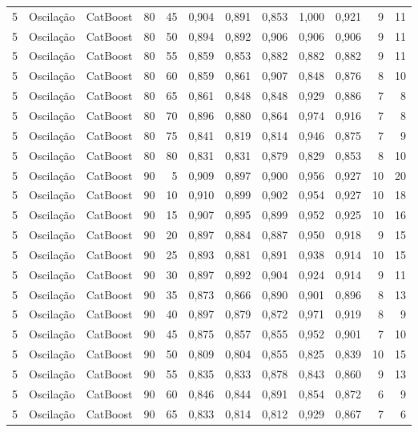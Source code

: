 \begin{longtable}{@{}rllrrrrrrrrr@{}}
5 & Oscilação & CatBoost & 80 & 45 & 0,904 & 0,891 & 0,853 & 1,000 & 0,921 & 9 & 11 \\
5 & Oscilação & CatBoost & 80 & 50 & 0,894 & 0,892 & 0,906 & 0,906 & 0,906 & 9 & 11 \\
5 & Oscilação & CatBoost & 80 & 55 & 0,859 & 0,853 & 0,882 & 0,882 & 0,882 & 9 & 11 \\
5 & Oscilação & CatBoost & 80 & 60 & 0,859 & 0,861 & 0,907 & 0,848 & 0,876 & 8 & 10 \\
5 & Oscilação & CatBoost & 80 & 65 & 0,861 & 0,848 & 0,848 & 0,929 & 0,886 & 7 & 8 \\
5 & Oscilação & CatBoost & 80 & 70 & 0,896 & 0,880 & 0,864 & 0,974 & 0,916 & 7 & 8 \\
5 & Oscilação & CatBoost & 80 & 75 & 0,841 & 0,819 & 0,814 & 0,946 & 0,875 & 7 & 9 \\
5 & Oscilação & CatBoost & 80 & 80 & 0,831 & 0,831 & 0,879 & 0,829 & 0,853 & 8 & 10 \\
5 & Oscilação & CatBoost & 90 & 5 & 0,909 & 0,897 & 0,900 & 0,956 & 0,927 & 10 & 20 \\
5 & Oscilação & CatBoost & 90 & 10 & 0,910 & 0,899 & 0,902 & 0,954 & 0,927 & 10 & 18 \\
5 & Oscilação & CatBoost & 90 & 15 & 0,907 & 0,895 & 0,899 & 0,952 & 0,925 & 10 & 16 \\
5 & Oscilação & CatBoost & 90 & 20 & 0,897 & 0,884 & 0,887 & 0,950 & 0,918 & 9 & 15 \\
5 & Oscilação & CatBoost & 90 & 25 & 0,893 & 0,881 & 0,891 & 0,938 & 0,914 & 10 & 15 \\
5 & Oscilação & CatBoost & 90 & 30 & 0,897 & 0,892 & 0,904 & 0,924 & 0,914 & 9 & 11 \\
5 & Oscilação & CatBoost & 90 & 35 & 0,873 & 0,866 & 0,890 & 0,901 & 0,896 & 8 & 13 \\
5 & Oscilação & CatBoost & 90 & 40 & 0,897 & 0,879 & 0,872 & 0,971 & 0,919 & 8 & 9 \\
5 & Oscilação & CatBoost & 90 & 45 & 0,875 & 0,857 & 0,855 & 0,952 & 0,901 & 7 & 10 \\
5 & Oscilação & CatBoost & 90 & 50 & 0,809 & 0,804 & 0,855 & 0,825 & 0,839 & 10 & 15 \\
5 & Oscilação & CatBoost & 90 & 55 & 0,835 & 0,833 & 0,878 & 0,843 & 0,860 & 9 & 13 \\
5 & Oscilação & CatBoost & 90 & 60 & 0,846 & 0,844 & 0,891 & 0,854 & 0,872 & 6 & 9 \\
5 & Oscilação & CatBoost & 90 & 65 & 0,833 & 0,814 & 0,812 & 0,929 & 0,867 & 7 & 6 \\

\end{longtable}
